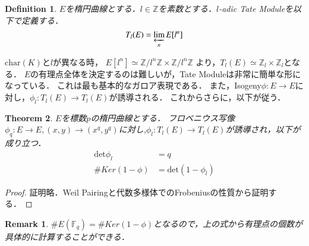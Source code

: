 \documentclass{ujarticle}
\newtheorem{thm}{Theorem}[section]
\newtheorem{dfn}[thm]{Definition}
\newtheorem*{rem}{Remark}
\begin{document}
\begin{dfn}
 $E$を楕円曲線とする．$l \in \mathbb{Z}$を素数とする．$l$-adic Tate Moduleを以下で定義する．
 \begin{equation*}
  T_l(E)= \varprojlim_{n}E[l^n]
 \end{equation*}
\end{dfn}
$\mathrm{char}(K)$と$l$が異なる時，
$E[l^n] \simeq \mathbb{Z}/l^n \mathbb{Z} \times \mathbb{Z}/l^n \mathbb{Z} $
より，$T_l(E)\simeq \mathbb{Z}_l \times \mathbb{Z}_l$となる．
$E$の有理点全体を決定するのは難しいが，Tate Moduleは非常に簡単な形になっている．
これは最も基本的なガロア表現である．
また，Isogeny$\phi:E \to E$に対し，$\phi_l:T_l(E) \to T_l(E)$が誘導される．
これからさらに，以下が従う．
\begin{thm}
  $E$を標数$p$の楕円曲線とする．
  フロベニウス写像$\phi_q: E \to E,(x,y) \to (x^q,y^q)$に対し,$\phi_l: T_l(E) \to T_l(E)$が誘導され，以下が成り立つ．
  \begin{align}
   \mathrm{det}\phi_l  &= q \\
   \#Ker(1 - \phi) &= \mathrm{det}(1 - \phi_l)
 \end{align}
\end{thm}
\begin{proof}
 証明略．Weil Pairingと代数多様体でのFrobeniusの性質から証明する．
\end{proof}
\begin{rem}
 $\#E(\mathbb{F}_q)=\#Ker(1 - \phi)$となるので，上の式から有理点の個数が具体的に計算することができる．
\end{rem}
\end{document}
